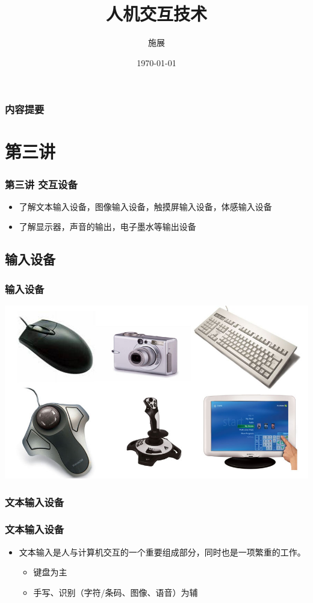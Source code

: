 \documentclass{beamer}
\title{人机交互技术}
\author{施展}
\institute{华中科技大学~武汉光电国家实验室}
\date{\today}
\begin{document}
\begin{frame}
	\titlepage
\end{frame}

\begin{frame}
	\frametitle{内容提要}
	\tableofcontents
\end{frame}

\section{第三讲}
\begin{frame}
	\frametitle{第三讲 交互设备}
	\begin{itemize}
		\item 了解文本输入设备，图像输入设备，触摸屏输入设备，体感输入设备
		\item 了解显示器，声音的输出，电子墨水等输出设备
	\end{itemize}
\end{frame}

\subsection{输入设备}
\begin{frame}
	\frametitle{输入设备}
	\begin{center}
	\includegraphics[width=\textwidth]{images/input-devices.jpg}
	\end{center}
\end{frame}

\subsubsection{文本输入设备}
\begin{frame}
	\frametitle{文本输入设备}
	\begin{itemize}
		\item 文本输入是人与计算机交互的一个重要组成部分，同时也是一项繁重的工作。
		\begin{itemize}
			\item 键盘为主
			\item 手写、识别（字符/条码、图像、语音）为辅
		\end{itemize}
	\end{itemize}
\end{frame}
\end{document}

